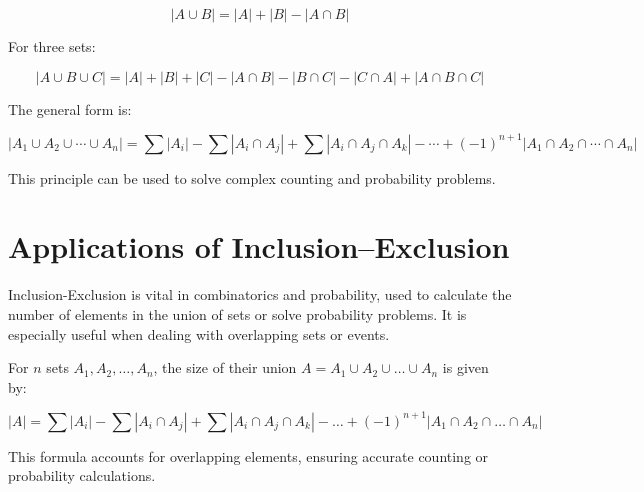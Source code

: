 \documentclass{article}
\begin{document}
    \begin{equation}
        |A \cup B| = |A| + |B| - |A \cap B|
    \end{equation}

    For three sets:

    \begin{equation}
        |A \cup B \cup C| = |A| + |B| + |C| - |A \cap B| - |B \cap C| - |C \cap A| + |A \cap B \cap C|
    \end{equation}

    The general form is:

    \begin{equation}
        |A_1 \cup A_2 \cup \cdots \cup A_n| = \sum |A_i| - \sum |A_i \cap A_j| + \sum |A_i \cap A_j \cap A_k| - \cdots + (-1)^{n+1}|A_1 \cap A_2 \cap \cdots \cap A_n|
    \end{equation}

    This principle can be used to solve complex counting and probability problems.

    \section{Applications of Inclusion–Exclusion}
    Inclusion-Exclusion is vital in combinatorics and probability, used to calculate the number of elements in the union of sets or solve probability problems. It is especially useful when dealing with overlapping sets or events.

    For $n$ sets $A_1, A_2, \ldots, A_n$, the size of their union $A = A_1 \cup A_2 \cup \ldots \cup A_n$ is given by:

    \begin{equation}
        |A| = \sum |A_i| - \sum |A_i \cap A_j| + \sum |A_i \cap A_j \cap A_k| - \ldots + (-1)^{n+1} |A_1 \cap A_2 \cap \ldots \cap A_n|
    \end{equation}

    This formula accounts for overlapping elements, ensuring accurate counting or probability calculations.
\end{document}
